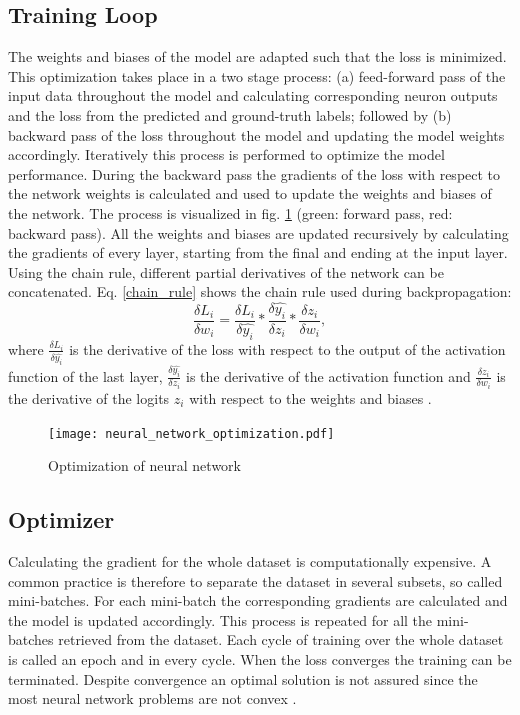 \subsection{Training Loop}
The weights and biases of the model are adapted such that the loss is minimized. This optimization takes place in a two stage process: (a) feed-forward pass of the input data throughout the model and calculating corresponding neuron outputs and the loss from the predicted and ground-truth labels; followed by (b) backward pass of the loss throughout the model and updating the model weights accordingly. Iteratively this process is performed to optimize the model performance. During the backward pass the gradients of the loss with respect to the network weights is calculated and used to update the weights and biases of the network. The process is visualized in fig. \ref{fig:neural_network_optimization} (green: forward pass, red: backward pass). All the weights and biases are updated recursively by calculating the gradients of every layer, starting from the final and ending at the input layer. Using the chain rule, different partial derivatives of the network can be concatenated. Eq. \ref{chain_rule} shows the chain rule used during backpropagation:
\begin{equation}
 \frac{\delta L_{i}}{\delta w_{i}} = \frac{\delta L_{i}}{\delta \hat{y_{i}}} * \frac{\delta \hat{y_{i}}}{\delta z_{i}} * \frac{\delta z_{i}}{\delta w_{i}}, 
 \label{chain_rule}
\end{equation}
where $\frac{\delta L_{i}}{\delta \hat{y_{i}}}$ is the derivative of the loss with respect to the output of the activation function of the last layer, $\frac{\delta \hat{y_{i}}}{\delta z_{i}}$ is the derivative of the activation function and $\frac{\delta z_{i}}{\delta w_{i}}$ is the derivative of the logits $z_{i}$ with respect to the weights and biases \cite{ShilohPerl2020}.

\begin{figure}[htpb]
  \centering
  \texttt{[image: neural\_network\_optimization.pdf]}
  \caption {Optimization of neural network}
  \label{fig:neural_network_optimization}
\end{figure}


\subsection{Optimizer}
Calculating the gradient for the whole dataset is computationally expensive. A common practice is therefore to separate the dataset in several subsets, so called mini-batches. For each mini-batch the corresponding gradients are calculated and the model is updated accordingly. This process is repeated for all the mini-batches retrieved from the dataset. Each cycle of training over the whole dataset is called an epoch and in every cycle. When the loss converges the training can be terminated. Despite convergence an optimal solution is not assured since the most neural network problems are not convex \cite{ShilohPerl2020}.


